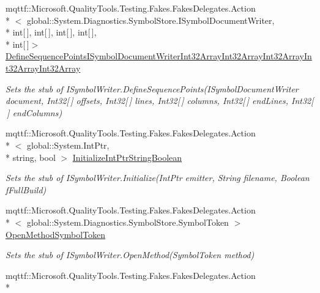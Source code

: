 \begin{DoxyCompactItemize}
mqttf\-::\-Microsoft.\-Quality\-Tools.\-Testing.\-Fakes.\-Fakes\-Delegates.\-Action\\*
$<$ global\-::\-System.\-Diagnostics.\-Symbol\-Store.\-I\-Symbol\-Document\-Writer, \\*
int\mbox{[}$\,$\mbox{]}, int\mbox{[}$\,$\mbox{]}, int\mbox{[}$\,$\mbox{]}, int\mbox{[}$\,$\mbox{]}, \\*
int\mbox{[}$\,$\mbox{]}$>$ \hyperlink{class_system_1_1_diagnostics_1_1_symbol_store_1_1_fakes_1_1_stub_i_symbol_writer_a4d289b8a96f7192f4cdd1ef686b3f124}{Define\-Sequence\-Points\-I\-Symbol\-Document\-Writer\-Int32\-Array\-Int32\-Array\-Int32\-Array\-Int32\-Array\-Int32\-Array}
\begin{DoxyCompactList}\small\item\em Sets the stub of I\-Symbol\-Writer.\-Define\-Sequence\-Points(\-I\-Symbol\-Document\-Writer document, Int32\mbox{[}$\,$\mbox{]} offsets, Int32\mbox{[}$\,$\mbox{]} lines, Int32\mbox{[}$\,$\mbox{]} columns, Int32\mbox{[}$\,$\mbox{]} end\-Lines, Int32\mbox{[}$\,$\mbox{]} end\-Columns)\end{DoxyCompactList}\item 
mqttf\-::\-Microsoft.\-Quality\-Tools.\-Testing.\-Fakes.\-Fakes\-Delegates.\-Action\\*
$<$ global\-::\-System.\-Int\-Ptr, \\*
string, bool $>$ \hyperlink{class_system_1_1_diagnostics_1_1_symbol_store_1_1_fakes_1_1_stub_i_symbol_writer_a73ffd22a76d444a661c395fc4de94e6c}{Initialize\-Int\-Ptr\-String\-Boolean}
\begin{DoxyCompactList}\small\item\em Sets the stub of I\-Symbol\-Writer.\-Initialize(\-Int\-Ptr emitter, String filename, Boolean f\-Full\-Build)\end{DoxyCompactList}\item 
mqttf\-::\-Microsoft.\-Quality\-Tools.\-Testing.\-Fakes.\-Fakes\-Delegates.\-Action\\*
$<$ global\-::\-System.\-Diagnostics.\-Symbol\-Store.\-Symbol\-Token $>$ \hyperlink{class_system_1_1_diagnostics_1_1_symbol_store_1_1_fakes_1_1_stub_i_symbol_writer_adf3fe7f5d6f4a47f3da00c414ce2c9b7}{Open\-Method\-Symbol\-Token}
\begin{DoxyCompactList}\small\item\em Sets the stub of I\-Symbol\-Writer.\-Open\-Method(\-Symbol\-Token method)\end{DoxyCompactList}\item 
mqttf\-::\-Microsoft.\-Quality\-Tools.\-Testing.\-Fakes.\-Fakes\-Delegates.\-Action\\*

\end{DoxyCompactItemize}
